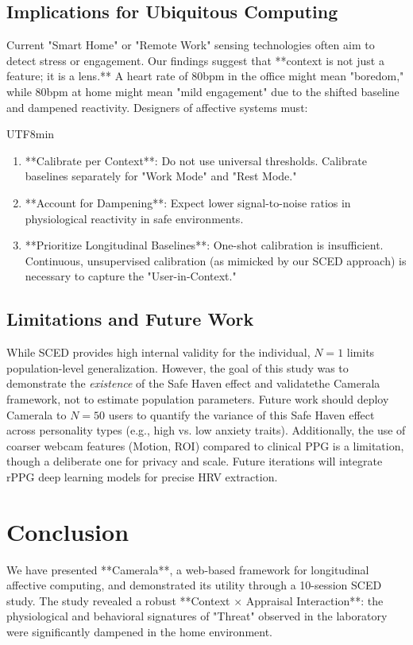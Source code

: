 \documentclass[journal]{IEEEtran}
\begin{document}
\subsection{Implications for Ubiquitous Computing}
Current "Smart Home" or "Remote Work" sensing technologies often aim to detect stress or engagement. Our findings suggest that **context is not just a feature; it is a lens.** A heart rate of 80bpm in the office might mean "boredom," while 80bpm at home might mean "mild engagement" due to the shifted baseline and dampened reactivity.
Designers of affective systems must:
\begin{CJK}{UTF8}{min}
\begin{enumerate}
    \item **Calibrate per Context**: Do not use universal thresholds. Calibrate baselines separately for "Work Mode" and "Rest Mode."
    \item **Account for Dampening**: Expect lower signal-to-noise ratios in physiological reactivity in safe environments.
    \item **Prioritize Longitudinal Baselines**: One-shot calibration is insufficient. Continuous, unsupervised calibration (as mimicked by our SCED approach) is necessary to capture the "User-in-Context."
\end{enumerate}
\end{CJK}

\subsection{Limitations and Future Work}
While SCED provides high internal validity for the individual, $N=1$ limits population-level generalization. However, the goal of this study was to demonstrate the \textit{existence} of the Safe Haven effect and validatethe Camerala framework, not to estimate population parameters. Future work should deploy Camerala to $N=50$ users to quantify the variance of this Safe Haven effect across personality types (e.g., high vs. low anxiety traits).
Additionally, the use of coarser webcam features (Motion, ROI) compared to clinical PPG is a limitation, though a deliberate one for privacy and scale. Future iterations will integrate rPPG deep learning models for precise HRV extraction.

\section{Conclusion}

We have presented **Camerala**, a web-based framework for longitudinal affective computing, and demonstrated its utility through a 10-session SCED study. The study revealed a robust **Context $\times$ Appraisal Interaction**: the physiological and behavioral signatures of "Threat" observed in the laboratory were significantly dampened in the home environment. 
\end{document}

